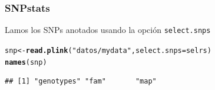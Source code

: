 \documentclass{beamer}\usepackage[]{graphicx}\usepackage[]{color}
\makeatletter
\newcommand{\hlstr}[1]{\textcolor[rgb]{0.192,0.494,0.8}{#1}}%
\newcommand{\hlstd}[1]{\textcolor[rgb]{0.345,0.345,0.345}{#1}}%
\newcommand{\hlkwb}[1]{\textcolor[rgb]{0.69,0.353,0.396}{#1}}%
\newcommand{\hlkwc}[1]{\textcolor[rgb]{0.333,0.667,0.333}{#1}}%
\newcommand{\hlkwd}[1]{\textcolor[rgb]{0.737,0.353,0.396}{\textbf{#1}}}%
\newenvironment{kframe}{%
 \def\at@end@of@kframe{}%
 \ifinner\ifhmode%
  \def\at@end@of@kframe{\end{minipage}}%
  \begin{minipage}{\columnwidth}%
 \fi\fi%
 \def\FrameCommand##1{\hskip\@totalleftmargin \hskip-\fboxsep
 \colorbox{shadecolor}{##1}\hskip-\fboxsep
     \hskip-\linewidth \hskip-\@totalleftmargin \hskip\columnwidth}%
 \MakeFramed {\advance\hsize-\width
   \@totalleftmargin\z@ \linewidth\hsize
   \@setminipage}}%
 {\par\unskip\endMakeFramed%
 \at@end@of@kframe}
\newenvironment{knitrout}{}{} %
\makeatother
\begin{document}
\begin{frame}[fragile]
\frametitle{SNPstats}
Lamos los SNPs anotados usando la opci\'on {\tt select.snps}
\begin{knitrout}\footnotesize
{}\color{fgcolor}\begin{kframe}
\begin{alltt}
\hlstd{snp}\hlkwb{<-}\hlkwd{read.plink}\hlstd{(}\hlstr{"datos/mydata"}\hlstd{,} \hlkwc{select.snps} \hlstd{= selrs)}
\hlkwd{names}\hlstd{(snp)}
\end{alltt}
\begin{verbatim}
## [1] "genotypes" "fam"       "map"
\end{verbatim}
\end{kframe}
\end{knitrout}
\end{frame}
\end{document}
